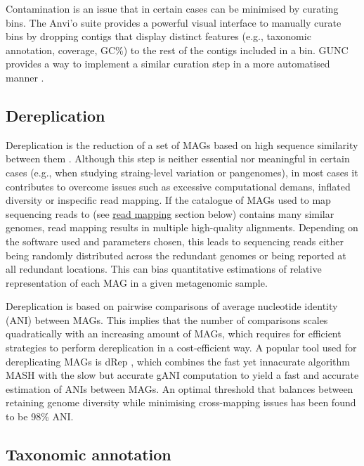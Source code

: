 \documentclass[
]{book}
\begin{document}
Contamination is an issue that in certain cases can be minimised by curating bins. The Anvi'o suite \citep{Eren2015-tt} provides a powerful visual interface to manually curate bins by dropping contigs that display distinct features (e.g., taxonomic annotation, coverage, GC\%) to the rest of the contigs included in a bin. GUNC provides a way to implement a similar curation step in a more automatised manner \citep{Orakov2021-pt}.

\hypertarget{genome-resolved-dereplication}{%
\subsection*{Dereplication}\label{genome-resolved-dereplication}}

Dereplication is the reduction of a set of MAGs based on high sequence similarity between them \citep{Evans2020-hs}. Although this step is neither essential nor meaningful in certain cases (e.g., when studying straing-level variation or pangenomes), in most cases it contributes to overcome issues such as excessive computational demans, inflated diversity or inspecific read mapping. If the catalogue of MAGs used to map sequencing reads to (see \protect\hyperlink{genome-resolved-mapping}{read mapping} section below) contains many similar genomes, read mapping results in multiple high-quality alignments. Depending on the software used and parameters chosen, this leads to sequencing reads either being randomly distributed across the redundant genomes or being reported at all redundant locations. This can bias quantitative estimations of relative representation of each MAG in a given metagenomic sample.

Dereplication is based on pairwise comparisons of average nucleotide identity (ANI) between MAGs. This implies that the number of comparisons scales quadratically with an increasing amount of MAGs, which requires for efficient strategies to perform dereplication in a cost-efficient way. A popular tool used for dereplicating MAGs is dRep \citep{Olm2017-nx}, which combines the fast yet innacurate algorithm MASH with the slow but accurate gANI computation to yield a fast and accurate estimation of ANIs between MAGs. An optimal threshold that balances between retaining genome diversity while minimising cross-mapping issues has been found to be 98\% ANI.

\hypertarget{genome-resolved-taxonomy}{%
\subsection*{Taxonomic annotation}\label{genome-resolved-taxonomy}}
\end{document}
